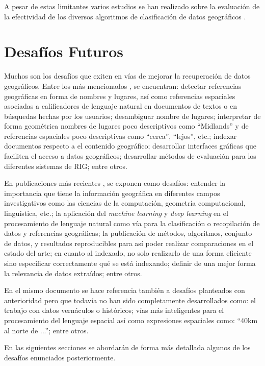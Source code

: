 \documentclass{llncs}
\begin{document}
A pesar de estas limitantes varios estudios se han realizado sobre la evaluación
de la efectividad de los diversos algoritmos de clasificación de datos geográficos
 \cite{larson2004jul,larson2004sep}.

\section{Desafíos Futuros}\label{sec:chall}

Muchos son los desafíos que exiten en vías de mejorar la recuperación de datos
geográficos. Entre los más mencionados \cite{purves2014}, se encuentran:
detectar referencias geográficas en forma de nombres y lugares, así como
referencias espaciales asociadas a calificadores de lenguaje natural en
documentos de textos o en búsquedas hechas por los usuarios; desambiguar nombre
de lugares; interpretar de forma geométrica nombres de lugares poco
descriptivos como ``Midlands'' y de referencias espaciales poco descriptivas
como ``cerca'', ``lejos'', etc.; indexar documentos respecto a el contenido
geográfico; desarrollar interfaces gráficas que faciliten el acceso a datos
geográficos; desarrollar métodos de evaluación para los diferentes sistemas de
RIG; entre otros.

En publicaciones más recientes \cite{purves2018}, se exponen como desafíos:
entender la importancia que tiene la información geográfica en diferentes campos
investigativos como las ciencias de la computación, geometría computacional,
linguística, etc.; la aplicación del \emph{machine learning} y \emph{deep
learning} en el procesamiento de lenguaje natural como vía para la
clasificación o recopilación de datos y referencias geográficas; la publicación
de métodos, algoritmos, conjunto de datos, y resultados reproducibles para así
poder realizar comparaciones en el estado del arte; en cuanto al indexado, no
solo realizarlo de una forma eficiente sino especificar correctamente qué se
está indexando; definir de una mejor forma la relevancia de datos extraídos;
entre otros.

En el mismo documento se hace referencia también a desafíos planteados con
anterioridad pero que todavía no han sido completamente desarrollados como: el
trabajo con datos vernáculos o históricos; vías más inteligentes para el
procesamiento del lenguaje espacial así como expresiones espaciales como:
``40km al norte de ...''; entre otros.

En las siguientes secciones se abordarán de forma más detallada algunos de los
desafíos enunciados posteriormente.
\end{document}
